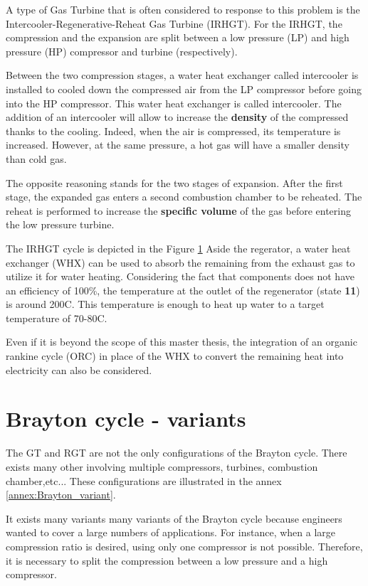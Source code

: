 A type of Gas Turbine that is often considered to response to this problem is the Intercooler-Regenerative-Reheat Gas Turbine (IRHGT). For the IRHGT, the compression and the expansion are split between a low pressure (LP) and high pressure (HP) compressor and turbine (respectively). 

Between the two compression stages, a water heat exchanger called intercooler is installed to cooled down the compressed air from the LP compressor before going into the HP compressor. This water heat exchanger is called intercooler. The addition of an intercooler will allow to increase the \textbf{density} of the compressed thanks to the cooling. Indeed, when the air is compressed, its temperature is increased. However, at the same pressure, a hot gas will have a smaller density than cold gas. 

The opposite reasoning stands for the two stages of expansion. After the first stage, the expanded gas enters a second combustion chamber to be reheated. The reheat is performed to increase the \textbf{specific volume} of the gas before entering the low pressure turbine. 

The IRHGT cycle is depicted in the Figure \ref{}
Aside the regerator, a water heat exchanger (WHX) can be used to absorb the remaining from the exhaust gas to utilize it for water heating. Considering the fact that components does not have an efficiency of 100\%, the temperature at the outlet of the regenerator (state \textbf{11}) is around 200\degree C. This temperature is enough to heat up water to a target temperature of 70-80\degree C.

Even if it is beyond the scope of this master thesis, the integration of an organic rankine cycle (ORC) in place of the WHX to convert the remaining heat into electricity can also be considered\citep{Quoilin2008}.

\section{Brayton cycle - variants}
The GT and RGT are not the only configurations of the Brayton cycle. There exists many other involving multiple compressors, turbines, combustion chamber,etc... These configurations are illustrated in the annex \ref{annex:Brayton_variant}.

It exists many variants many variants of the Brayton cycle because engineers wanted to cover a large numbers of applications. For instance, when a large compression ratio is desired, using only one compressor is not possible. Therefore, it is necessary to split the compression between a low pressure and a high compressor. 
